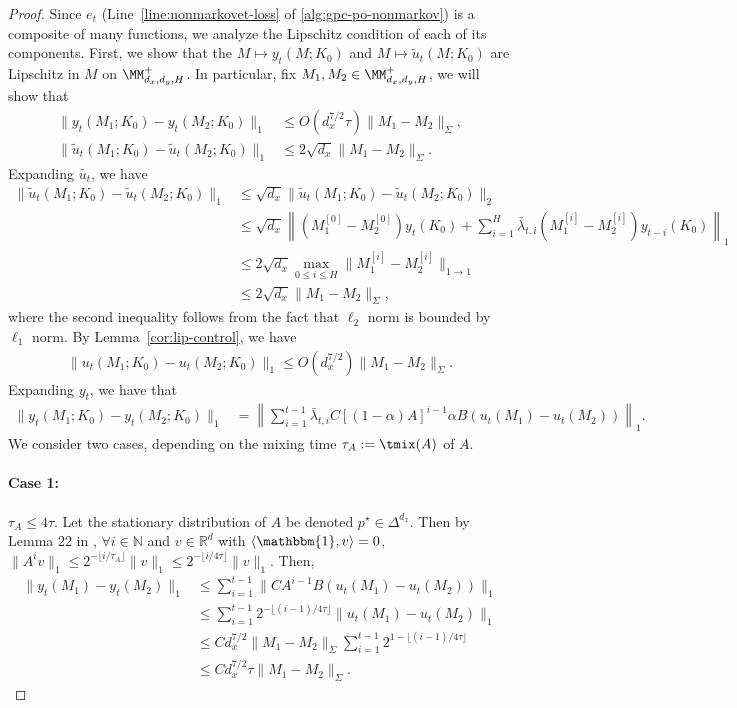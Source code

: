 \begin{proof}
Since $e_t$ (Line~\ref{line:nonmarkovet-loss} of \cref{alg:gpc-po-nonmarkov}) is a composite of many functions, we analyze the Lipschitz condition of each of its components. First, we show that the $M\mapsto y_t(M;K_0)$ and $M\mapsto \tilde{u}_t(M;K_0)$ are Lipschitz in $M$ on $\MM_{d_x,d_y,H}^{+}$.
In particular, fix $M_1,M_2\in\MM_{d_x,d_y,H}^{+}$, we will show that 
\begin{align*}
\|y_t(M_1;K_0)-y_t(M_2;K_0)\|_1&\le O(d_x^{7/2}\tau) \|M_1-M_2\|_{\Sigma}, \\ 
\|\tilde{u}_t(M_1;K_0)-\tilde{u}_t(M_2;K_0)\|_1&\le 2\sqrt{d_x} \|M_1-M_2\|_{\Sigma}.
\end{align*}
Expanding $\tilde{u_t}$, we have
\begin{align*}
\|\tilde{u}_t(M_1;K_0)-\tilde{u}_t(M_2;K_0)\|_1&\le \sqrt{d_x}\|\tilde{u}_t(M_1;K_0)-\tilde{u}_t(M_2;K_0)\|_2\\
&\le \sqrt{d_x}\left\|(M_1^{[0]}-M_2^{[0]})y_t(K_0)+\sum_{i=1}^H\bar{\lambda}_{t,i}(M_1^{[i]}-M_2^{[i]})y_{t-i}(K_0)\right\|_1\\
&\le 2\sqrt{d_x} \max_{0\le i\le H} \|M_1^{[i]}-M_2^{[i]}\|_{1\rightarrow 1} \\
&\le 2\sqrt{d_x}\|M_1-M_2\|_{\Sigma},
\end{align*}
where the second inequality follows from the fact that $\ell_2$ norm is bounded by $\ell_1$ norm. By Lemma~\ref{cor:lip-control}, we have
\begin{align*}
\|u_t(M_1;K_0)-u_t(M_2;K_0)\|_1\le O(d_x^{7/2})\|M_1-M_2\|_{\Sigma}.
\end{align*}
Expanding $y_t$, we have that
\begin{align*}
\|y_t(M_1;K_0)-y_t(M_2;K_0)\|_1&=\left\|\sum_{i=1}^{t-1}\bar{\lambda}_{t,i}C[(1-\alpha)A]^{i-1}\alpha B(u_t(M_1)-u_t(M_2))\right\|_1.
\end{align*}
We consider two cases, depending on the mixing time $\tau_A:=\tmix(A)$ of $A$. 

\paragraph{Case 1:} $\tau_A\le 4\tau$. Let the stationary distribution of $A$ be denoted $p^{\star}\in\Delta^{d_x}$. Then by Lemma 22 in \citep{golowich2024online}, $\forall i\in\mathbb{N}$ and $v\in\mathbb{R}^d$ with $\langle \mathbbm{1}, v\rangle=0$, $\|A^{i}v\|_1\le 2^{-\lfloor i/\tau_A\rfloor}\|v\|_1\le 2^{-\lfloor i/4\tau\rfloor}\|v\|_1$. Then,
\begin{align*}
\|y_t(M_1)-y_t(M_2)\|_1&\le \sum_{i=1}^{t-1} \|CA^{i-1}B(u_t(M_1)-u_t(M_2))\|_1\\
&\le \sum_{i=1}^{t-1} 2^{-\lfloor (i-1)/4\tau\rfloor}\|u_t(M_1)-u_t(M_2)\|_1\\
&\le Cd_x^{7/2}\|M_1-M_2\|_{\Sigma}\sum_{i=1}^{t-1} 2^{1-\lfloor (i-1)/4\tau\rfloor}\\
&\le Cd_x^{7/2}\tau \|M_1-M_2\|_{\Sigma}. 
\end{align*}


\end{proof}
